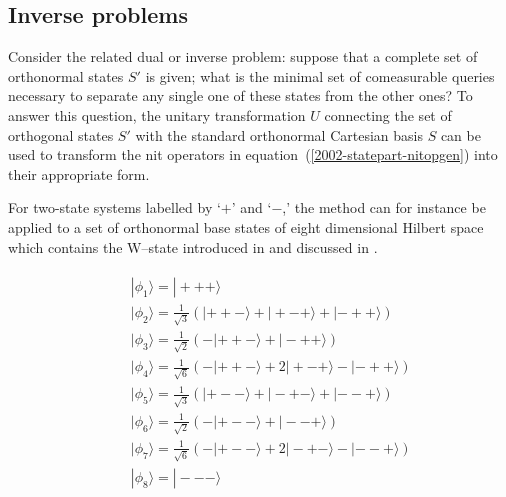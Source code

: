 \documentclass{article}
\begin{document}
\subsection{Inverse problems}
Consider the related dual or inverse problem:
suppose that a complete set of orthonormal states $S'$ is given;
what is the minimal set of comeasurable queries necessary to separate
any single one of these states from the other ones?
To answer this question, the unitary transformation $U$ connecting the
set of orthogonal states $S'$ with the standard orthonormal Cartesian basis $S$
can be used to transform the nit operators in equation~(\ref{2002-statepart-nitopgen})
into their appropriate form.


For two-state systems labelled by `$+$' and `$-$,'
the method can for instance be applied to
a set of orthonormal base states of eight dimensional Hilbert space which contains the
W--state introduced in \cite{zeil-97} and discussed in \cite{dvc-2000}.

 \begin{eqnarray}
 \begin{array}{lll}
 &&|\phi_1\rangle=  |+++\rangle  \\
 &&|\phi_2\rangle=\frac{1}{\sqrt{3}} \left( |++-\rangle+|+-+\rangle +|-++\rangle \right)  \\
 &&|\phi_3\rangle=\frac{1}{\sqrt{2}} \left( -|++-\rangle+|-++\rangle \right)  \\
 &&|\phi_4\rangle=\frac{1}{\sqrt{6}} \left( -|++-\rangle+2 |+-+\rangle -|-++\rangle \right)  \\
 &&|\phi_5\rangle=\frac{1}{\sqrt{3}} \left(  |+--\rangle+             |-+-\rangle +          |--+\rangle \right)  \\
 &&|\phi_6\rangle=\frac{1}{\sqrt{2}} \left( -|+--\rangle+|--+\rangle \right)  \\
 &&|\phi_7\rangle=\frac{1}{\sqrt{6}} \left( -|+--\rangle+ 2|-+-\rangle -|--+\rangle \right)  \\
 &&|\phi_8\rangle=  |---\rangle
 \end{array}
\label{2002-garda-f1}
 \end{eqnarray}
\end{document}
